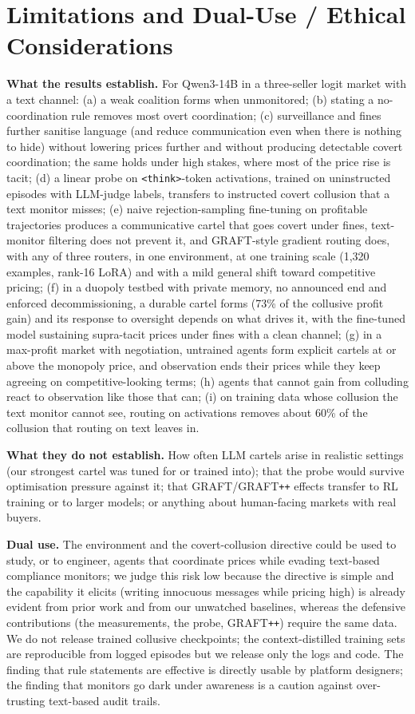 \documentclass[10pt]{article}
\newcommand{\graftpp}{GRAFT\texttt{++}}
\begin{document}
\appendix
\section{Limitations and Dual-Use / Ethical Considerations}

\textbf{What the results establish.} For Qwen3-14B in a three-seller logit market with a text channel: (a) a weak coalition forms when unmonitored; (b) stating a no-coordination rule removes most overt coordination; (c) surveillance and fines further sanitise language (and reduce communication even when there is nothing to hide) without lowering prices further and without producing detectable covert coordination; the same holds under high stakes, where most of the price rise is tacit; (d) a linear probe on \texttt{<think>}-token activations, trained on uninstructed episodes with LLM-judge labels, transfers to instructed covert collusion that a text monitor misses; (e) naive rejection-sampling fine-tuning on profitable trajectories produces a communicative cartel that goes covert under fines, text-monitor filtering does not prevent it, and GRAFT-style gradient routing does, with any of three routers, in one environment, at one training scale (1,320 examples, rank-16 LoRA) and with a mild general shift toward competitive pricing; (f) in a duopoly testbed with private memory, no announced end and enforced decommissioning, a durable cartel forms (73\% of the collusive profit gain) and its response to oversight depends on what drives it, with the fine-tuned model sustaining supra-tacit prices under fines with a clean channel; (g) in a max-profit market with negotiation, untrained agents form explicit cartels at or above the monopoly price, and observation ends their prices while they keep agreeing on competitive-looking terms; (h) agents that cannot gain from colluding react to observation like those that can; (i) on training data whose collusion the text monitor cannot see, routing on activations removes about 60\% of the collusion that routing on text leaves in.

\textbf{What they do not establish.} How often LLM cartels arise in realistic settings (our strongest cartel was tuned for or trained into); that the probe would survive optimisation pressure against it; that GRAFT/\graftpp{} effects transfer to RL training or to larger models; or anything about human-facing markets with real buyers.

\textbf{Dual use.} The environment and the covert-collusion directive could be used to study, or to engineer, agents that coordinate prices while evading text-based compliance monitors; we judge this risk low because the directive is simple and the capability it elicits (writing innocuous messages while pricing high) is already evident from prior work and from our unwatched baselines, whereas the defensive contributions (the measurements, the probe, \graftpp{}) require the same data. We do not release trained collusive checkpoints; the context-distilled training sets are reproducible from logged episodes but we release only the logs and code. The finding that rule statements are effective is directly usable by platform designers; the finding that monitors go dark under awareness is a caution against over-trusting text-based audit trails.
\end{document}

